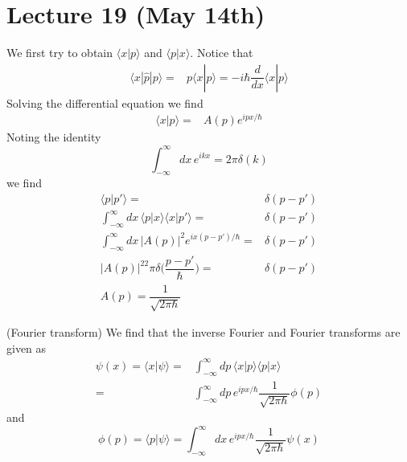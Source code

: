 \section{Lecture 19 (May 14th)}
\begin{lem}
We first try to obtain $\langle x|p\rangle $ and $\langle p|x\rangle $. Notice that
\begin{align*}
\langle x|\hat{p}|p\rangle =&p\langle x|p\rangle =-i\hbar \dfrac{d }{d x}\langle x|p\rangle 
\end{align*}
Solving the differential equation we find
\begin{align*}
\langle x|p\rangle =&A(p)e^{ipx/\hbar }
\end{align*}
Noting the identity
\[\int ^{\infty }_{-\infty }dx\,e^{ikx}=2\pi \delta (k)\]
we find
\begin{align*}
\langle p|p'\rangle =&\delta (p-p')\\
\int ^{\infty }_{-\infty }dx\,\langle p|x\rangle \langle x|p'\rangle =&\delta (p-p')\\
\int ^{\infty }_{-\infty }dx\,|A(p)|^2e^{ix(p-p')/\hbar }=&\delta (p-p')\\
|A(p)|^22\pi \delta \Big(\dfrac{p-p'}{\hbar }\Big)=&\delta (p-p')\\
A(p)=\dfrac{1}{\sqrt{2\pi \hbar }}
\end{align*}
\end{lem}
\vspace{2ex}
\begin{thm}
(Fourier transform) We find that the inverse Fourier and Fourier transforms are given as 
\begin{align*}
\psi (x)=\langle x|\psi \rangle =&\int ^{\infty }_{-\infty }dp\,\langle x|p\rangle \langle p|x\rangle\\ 
=&\int ^{\infty }_{-\infty }dp\,e^{ipx/\hbar }\dfrac{1}{\sqrt{2\pi \hbar }}\phi (p)
\end{align*}
and
\[\phi (p)=\langle p|\psi \rangle =\int ^{\infty }_{-\infty }dx\,e^{ipx/\hbar }\dfrac{1}{\sqrt{2\pi \hbar }}\psi (x)\]
\end{thm}
\vspace{2ex}

